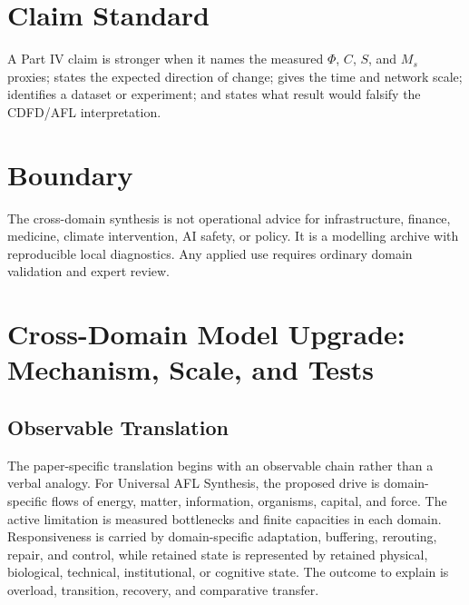 \documentclass[12pt,a4paper]{article}
\begin{document}
\section{Claim Standard}

A Part IV claim is stronger when it names the measured $\Phi$, $C$, $S$, and
$M_s$ proxies; states the expected direction of change; gives the time and
network scale; identifies a dataset or experiment; and states what result would
falsify the CDFD/AFL interpretation.

\section{Boundary}

The cross-domain synthesis is not operational advice for infrastructure, finance,
medicine, climate intervention, AI safety, or policy. It is a modelling archive
with reproducible local diagnostics. Any applied use requires ordinary domain
validation and expert review.

\section{Cross-Domain Model Upgrade: Mechanism, Scale, and Tests}

\subsection{Observable Translation}

The paper-specific translation begins with an observable chain rather than a
verbal analogy. For Universal AFL Synthesis, the proposed drive is domain-specific flows of energy, matter, information, organisms, capital, and force.
The active limitation is measured bottlenecks and finite capacities in each domain. Responsiveness is carried by
domain-specific adaptation, buffering, rerouting, repair, and control, while retained state is represented by
retained physical, biological, technical, institutional, or cognitive state. The outcome to explain is overload, transition, recovery, and comparative transfer.
\end{document}
